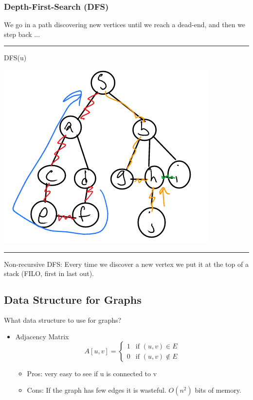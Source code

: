 \documentclass[11pt]{article}
\begin{document}
\subsubsection{Depth-First-Search (DFS)}
\label{sec:org116bada}
We go in a path discovering new vertices until we reach a dead-end, and then we step back \(\ldots\)

\noindent\rule{\textwidth}{0.5pt}
\begin{algorithmic}
  \State DFS(u)
        \EndIf
  \EndFor        
\end{algorithmic}
\begin{center}
\includegraphics[width=.9\linewidth]{./Images/i18.png}
\end{center}

\noindent\rule{\textwidth}{0.5pt}
Non-recursive DFS: Every time we discover a new vertex we put it at the top of a stack (FILO, first in last out).
\subsection{Data Structure for Graphs}
\label{sec:org6b0058f}
What data structure to use for graphs?
\begin{itemize}
\item Adjacency Matrix
\begin{equation*}
  A[u,v] =
  \begin{cases}
    1 & \text{if }(u,v)\in E
    \\ 0 & \text{if }(u,v)\notin E
  \end{cases}
\end{equation*}
\begin{itemize}
\item Pros: very easy to see if u is connected to v
\item Cons: If the graph has few edges it is wasteful. \(O(n^2)\) bits of memory.
\end{itemize}
\end{itemize}
\end{document}
